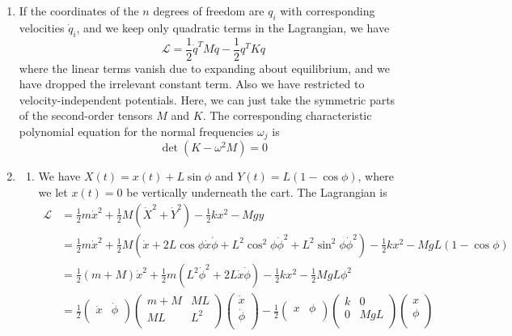 \documentclass[a4paper]{article}
\begin{document}
\begin{ans}\leavevmode
\begin{enumerate}[label=(\alph*)]
\item If the coordinates of the $n$ degrees of freedom are $q_i$ with corresponding velocities $\dot{q}_i$, and we keep only quadratic terms in the Lagrangian, we have
$$\mathcal{L}=\frac{1}{2}\dot{q}^TM\dot{q}-\frac{1}{2}q^TKq$$
where the linear terms vanish due to expanding about equilibrium, and we have dropped the irrelevant constant term. Also we have restricted to velocity-independent potentials. Here, we can just take the symmetric parts of the second-order tensors $M$ and $K$. The corresponding characteristic polynomial equation for the normal frequencies $\omega_j$ is
$$\det(K-\omega^2M)=0$$
\item 
\begin{enumerate}[label=(\roman*)]
\item We have $X(t)=x(t)+L\sin\phi$ and $Y(t)=L(1-\cos\phi)$, where we let $x(t)=0$ be vertically underneath the cart. The Lagrangian is
\begin{align}
    \mathcal{L}&=\frac{1}{2}m\dot{x}^2+\frac{1}{2}M(\dot{X}^2+\dot{Y}^2)-\frac{1}{2}kx^2-Mgy\nonumber\\&=\frac{1}{2}m\dot{x}^2+\frac{1}{2}M(\dot{x}+2L\cos\phi\dot{x}\dot{\phi}+L^2\cos^2\phi\dot{\phi}^2+L^2\sin^2\phi\dot{\phi}^2)-\frac{1}{2}kx^2-MgL(1-\cos\phi)\nonumber\\&=\frac{1}{2}(m+M)\dot{x}^2+\frac{1}{2}m(L^2\dot{\phi}^2+2L\dot{x}\dot{\phi})-\frac{1}{2}kx^2-\frac{1}{2}MgL\phi^2\nonumber\\&=\frac{1}{2}\begin{pmatrix}\dot{x}&\dot{\phi}\\\end{pmatrix}\begin{pmatrix}m+M&ML\\ML&L^2\\\end{pmatrix}\begin{pmatrix}\dot{x}\\\dot{\phi}\\\end{pmatrix}-\frac{1}{2}\begin{pmatrix}x&\phi\\\end{pmatrix}\begin{pmatrix}k&0\\0&MgL\\\end{pmatrix}\begin{pmatrix}x\\\phi\\\end{pmatrix}\nonumber

\end{align}
\end{enumerate}
\end{enumerate}
\end{ans}
\end{document}
